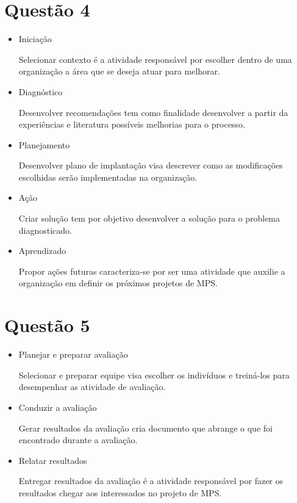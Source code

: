 \section{Questão 4}
\begin{itemize}
    \item Iniciação

    Selecionar contexto é a atividade responsável por escolher dentro de uma organização a área que se deseja atuar para melhorar.

    \item Diagnóstico

    Desenvolver recomendações tem como finalidade desenvolver a partir da experiências e literatura possíveis melhorias para o processo.

    \item Planejamento


    Desenvolver plano de implantação visa descrever como as modificações escolhidas serão implementadas na organização.

    \item Ação

    Criar solução tem por objetivo desenvolver a solução para o problema diagnosticado.

    \item Aprendizado

    Propor ações futuras caracteriza-se por ser uma atividade que auxilie a organização em definir os próximos projetos de MPS.

\end{itemize}

\section{Questão 5} 
\begin{itemize}
    \item Planejar e preparar avaliação

    Selecionar e preparar equipe visa escolher os indivíduos e treiná-los para desempenhar as atividade de avaliação.

    \item Conduzir a avaliação

    Gerar resultados da avaliação cria documento que abrange o que foi encontrado durante a avaliação.

    \item Relatar resultados

    Entregar resultados da avaliação é a atividade responsável por fazer os resultados chegar aos interessados no projeto de MPS.
 
\end{itemize}

    
